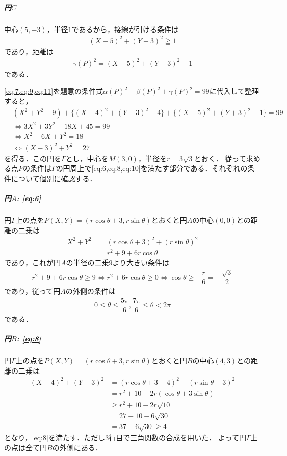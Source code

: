 \documentclass[../../main.tex]{subfiles}
\begin{document}
\subparagraph{円$C$}
中心$(5, -3)$，半径$1$であるから，接線が引ける条件は
\begin{align}
  (X-5)^2 + (Y+3)^2 \geqq 1 \label{eq:10}
\end{align}
であり，距離は
\begin{align}
  \gamma(P)^2 = (X-5)^2 + (Y+3)^2 - 1 \label{eq:11}
\end{align}
である．
\casesend

\cref{eq:7,eq:9,eq:11}を題意の条件式$\alpha(P)^2 + \beta(P)^2 + \gamma(P)^2 = 99$に代入して整理すると，
\begin{align}
  &(X^2 + Y^2 - 9) + \{(X-4)^2 + (Y-3)^2 - 4\} + \{(X-5)^2 + (Y+3)^2 - 1\} = 99 \nonumber\\
  &\Longleftrightarrow 3X^2 + 3Y^2 - 18X + 45 = 99 \nonumber\\
  &\Longleftrightarrow X^2 - 6X + Y^2 = 18 \nonumber\\
  &\Longleftrightarrow (X-3)^2 + Y^2 = 27 \label{eq:12}
\end{align}
を得る．この円を$\Gamma$とし，中心を$M(3, 0)$，半径を$r = 3\sqrt{3}$とおく．
従って求める点$P$の条件は$\Gamma$の円周上で\cref{eq:6,eq:8,eq:10}を満たす部分である．それぞれの条件について個別に確認する．

\subparagraph{円$A$: \cref{eq:6}}

円$\Gamma$上の点を$P(X,Y)=(r\cos\theta+3,r\sin\theta)$とおくと円$A$の中心$(0,0)$との距離の二乗は
\begin{align}
  X^2 + Y^2
  &= (r\cos\theta+3)^2+\left(r\sin\theta\right)^2 \\
  &= r^2 + 9 + 6r\cos\theta
\end{align}
であり，これが円$A$の半径の二乗$9$より大きい条件は
\begin{align}
  r^2 + 9 + 6r\cos\theta \ge 9 \iff r^2 + 6r\cos\theta \ge 0 \iff \cos\theta \ge -\dfrac{r}{6} = -\dfrac{\sqrt{3}}{2}
\end{align}
であり，従って円$A$の外側の条件は
\begin{align}
  0 \le \theta \le \dfrac{5\pi}{6}, \dfrac{7\pi}{6}\le \theta < 2\pi \label{eq:13}
\end{align}
である．

\subparagraph{円$B$: \cref{eq:8}}

円$\Gamma$上の点を$P(X,Y)=(r\cos\theta+3,r\sin\theta)$とおくと円$B$の中心$(4,3)$との距離の二乗は
\begin{align}
  (X-4)^2 + (Y-3)^2
  &= (r\cos\theta+3-4)^2+\left(r\sin\theta-3\right)^2 \\
  &= r^2 + 10 - 2r(\cos\theta + 3\sin\theta) \\
  &\ge r^2 + 10 - 2r\sqrt{10} \\
  &= 27 + 10 -6\sqrt{30} \\
  &= 37 - 6\sqrt{30} \ge 4
\end{align}
となり，\cref{eq:8}を満たす．ただし3行目で三角関数の合成を用いた．
よって円$\Gamma$上の点は全て円$B$の外側にある．
\end{document}
